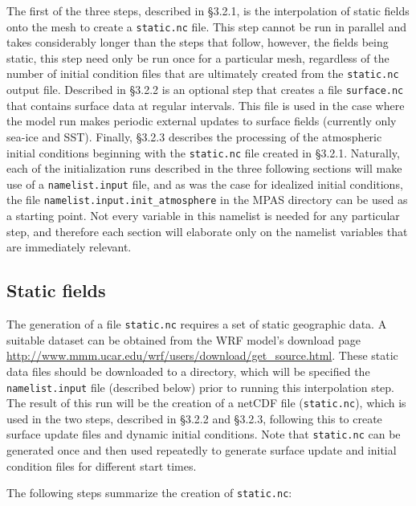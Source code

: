 The first of the three steps, described in \S 3.2.1, is the interpolation of static fields onto the mesh to create a {\tt static.nc} file.  This step cannot be run in parallel and takes considerably longer than the steps that follow, however, the fields being static, this step need only be run once for a particular mesh, regardless of the number of initial condition files that are ultimately created from the {\tt static.nc} output file.  Described in \S 3.2.2 is an optional step that creates a file {\tt surface.nc} that contains surface data at regular intervals. This file is used in the case where the model run makes periodic external updates to surface fields (currently only sea-ice and SST).  Finally, \S 3.2.3 describes the processing of the atmospheric initial conditions beginning with the {\tt static.nc} file created in \S 3.2.1.  Naturally, each of the initialization runs described in the three following sections will make use of a {\tt namelist.input} file, and as was the case for idealized initial conditions, the file {\tt namelist.input.init\_atmosphere} in the MPAS directory can be used as a starting point.  Not every variable in this namelist is needed for any particular step, and therefore each section will elaborate only on the namelist variables that are immediately relevant.

\subsection{Static fields}

The generation of a file {\tt static.nc} requires a set of static geographic data.  A suitable dataset can be obtained from the WRF model's download page \\
 \url{http://www.mmm.ucar.edu/wrf/users/download/get\_source.html}.  These static data files should be downloaded to a directory, which will be specified the {\tt namelist.input} file (described below) prior to running this interpolation step.  The result of this run will be the creation of a netCDF file ({\tt static.nc}), which is used in the two steps, described in \S 3.2.2 and \S 3.2.3, following this to create surface update files and dynamic initial conditions.  Note that {\tt static.nc} can be generated once and then used repeatedly to generate surface update and initial condition files for different start times.

The following steps summarize the creation of {\tt static.nc}:

